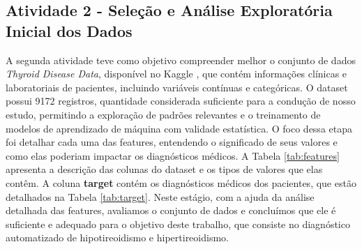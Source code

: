 \documentclass[11pt]{article}
\begin{document}
\subsection{Atividade 2 - Seleção e Análise Exploratória Inicial dos Dados}
A segunda atividade teve como objetivo compreender melhor o conjunto de dados \textit{Thyroid Disease Data}, disponível no Kaggle \cite{thyroid-dataset}, que contém informações clínicas e laboratoriais de pacientes, incluindo variáveis contínuas e categóricas. O dataset possui 9172 registros, quantidade considerada suficiente para a condução de nosso estudo, permitindo a exploração de padrões relevantes e o treinamento de modelos de aprendizado de máquina com validade estatística.
O foco dessa etapa foi detalhar cada uma das features, entendendo o significado de seus valores e como elas poderiam impactar os diagnósticos médicos. 
A Tabela \ref{tab:features} apresenta a descrição das colunas do dataset e os tipos de valores que elas contêm.
A coluna \textbf{target} contém os diagnósticos médicos dos pacientes, que estão detalhados na Tabela \ref{tab:target}.  
Neste estágio, com a ajuda da análise detalhada das features, avaliamos o conjunto de dados e concluímos que ele é suficiente e adequado para o objetivo deste trabalho, que consiste no diagnóstico automatizado de hipotireoidismo e hipertireoidismo.
\end{document}
